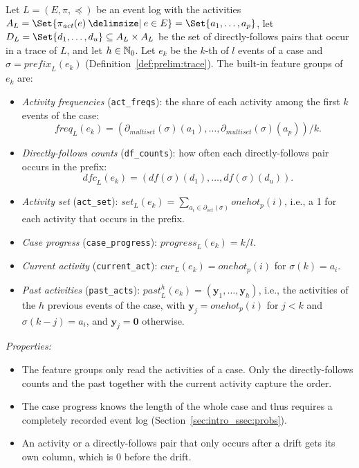 \begin{definition}
	\label{def:approach:intra}
	Let $L = (E, \pi, \preceq)$ be an event log with the activities $A_L = \Set{\pi_{\mathit{act}}(e) \given e \in E} = \Set{a_1, \dots, a_p}$, let $D_L = \Set{d_1, \dots, d_u} \subseteq A_L \times A_L$ be the set of directly-follows pairs that occur in a trace of $L$, and let $h \in \mathbb N_0$. Let $e_k$ be the $k$-th of $l$ events of a case and $\sigma = \mathit{prefix}_L(e_k)$ (Definition~\ref{def:prelim:trace}). The built-in feature groups of $e_k$ are:
	\begin{itemize}
		\item \emph{Activity frequencies} (\texttt{act\_freqs}): the share of each activity among the first $k$ events of the case:
		      \[
			      \mathit{freq}_L(e_k) = (\partial_{\mathit{multiset}}(\sigma)(a_1), \dots, \partial_{\mathit{multiset}}(\sigma)(a_p)) / k.
		      \]
		\item \emph{Directly-follows counts} (\texttt{df\_counts}): how often each directly-follows pair occurs in the prefix:
		      \[
			      \mathit{dfc}_L(e_k) = (\mathit{df}(\sigma)(d_1), \dots, \mathit{df}(\sigma)(d_u)).
		      \]
		\item \emph{Activity set} (\texttt{act\_set}): $\mathit{set}_L(e_k) = \sum_{a_i \in \partial_{\mathit{set}}(\sigma)} \mathit{onehot}_p(i)$, i.e., a 1 for each activity that occurs in the prefix.
		\item \emph{Case progress} (\texttt{case\_progress}): $\mathit{progress}_L(e_k) = k / l$.
		\item \emph{Current activity} (\texttt{current\_act}): $\mathit{cur}_L(e_k) = \mathit{onehot}_p(i)$ for $\sigma(k) = a_i$.
		\item \emph{Past activities} (\texttt{past\_acts}): $\mathit{past}^h_L(e_k) = (\mathbf{y}_1, \dots, \mathbf{y}_h)$, i.e., the activities of the $h$ previous events of the case, with $\mathbf{y}_j = \mathit{onehot}_p(i)$ for $j < k$ and $\sigma(k - j) = a_i$, and $\mathbf{y}_j = \mathbf{0}$ otherwise.
	\end{itemize}
\end{definition}

\noindent\emph{Properties:}
\begin{itemize}[beginpenalty=10000]
	\item The feature groups only read the activities of a case. Only the directly-follows counts and the past together with the current activity capture the order.
	\item The case progress knows the length of the whole case and thus requires a completely recorded event log (Section~\ref{sec:intro_ssec:probs}).
	\item An activity or a directly-follows pair that only occurs after a drift gets its own column, which is 0 before the drift.
\end{itemize}

